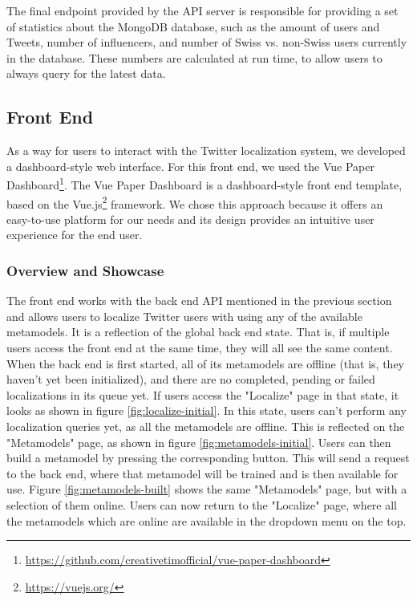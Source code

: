 \documentclass[10pt,a4paper]{article}
\begin{document}
The final endpoint provided by the API server is responsible for providing a set of statistics about the MongoDB database, such as the amount of users and Tweets, number of influencers, and number of Swiss vs. non-Swiss users currently in the database. These numbers are calculated at run time, to allow users to always query for the latest data. 

\subsection{Front End}
As a way for users to interact with the Twitter localization system, we developed a dashboard-style web interface. For this front end, we used the Vue Paper Dashboard\footnote{\href{https://github.com/creativetimofficial/vue-paper-dashboard}{https://github.com/creativetimofficial/vue-paper-dashboard}}. The Vue Paper Dashboard is a dashboard-style front end template, based on the Vue.js\footnote{\href{https://vuejs.org/}{https://vuejs.org/}} framework. We chose this approach because it offers an easy-to-use platform for our needs and its design provides an intuitive user experience for the end user.

\subsubsection{Overview and Showcase}
The front end works with the back end API mentioned in the previous section and allows users to localize Twitter users with using any of the available metamodels. It is a reflection of the global back end state. That is, if multiple users access the front end at the same time, they will all see the same content. When the back end is first started, all of its metamodels are offline (that is, they haven't yet been initialized), and there are no completed, pending or failed localizations in its queue yet. If users access the "Localize" page in that state, it looks as shown in figure \ref{fig:localize-initial}. In this state, users can't perform any localization queries yet, as all the metamodels are offline. This is reflected on the "Metamodels" page, as shown in figure \ref{fig:metamodels-initial}. Users can then build a metamodel by pressing the corresponding button. This will send a request to the back end, where that metamodel will be trained and is then available for use. Figure \ref{fig:metamodels-built} shows the same "Metamodels" page, but with a selection of them online. Users can now return to the "Localize" page, where all the metamodels which are online are available in the dropdown menu on the top. 
\end{document}
